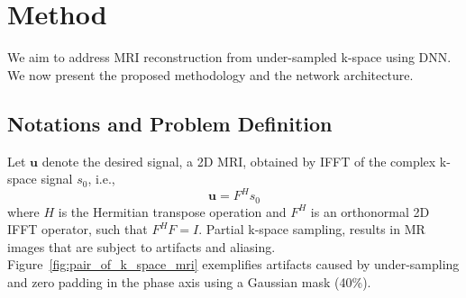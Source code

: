 \documentclass[10pt,journal,compsoc]{IEEEtran}
\begin{document}
\section{Method}\label{method_section}
We aim to address MRI reconstruction from under-sampled k-space using DNN. We now present the proposed methodology and the network architecture.
\subsection{Notations and Problem Definition}
Let $\bm{u}$ denote the desired signal, a 2D MRI, obtained by IFFT of the complex k-space signal $s_{0}$, i.e., 
\begin{equation}
\bm{u}=F^{H}s_{0}
\end{equation} 
where $H$ is the Hermitian transpose operation and $F^{H}$ is an orthonormal 2D IFFT operator, such that $F^{H}F=I$. 
Partial k-space sampling, results in MR images that are subject to artifacts and aliasing. 
Figure~\ref{fig:pair_of_k_space_mri} exemplifies artifacts caused by under-sampling and zero padding in the phase axis using a Gaussian mask (40\%).
\vspace{-0.5cm}
\end{document}
